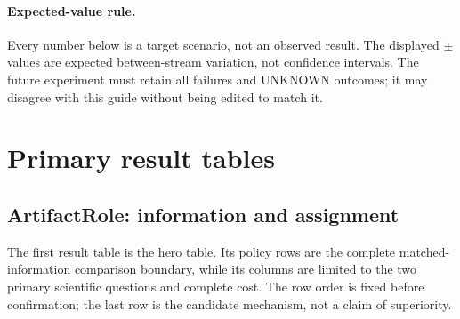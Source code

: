 \documentclass[sigconf,anonymous]{aamas}
\begin{document}
\paragraph{Expected-value rule.} Every number below is a target scenario, not an observed result. The displayed $\pm$ values are expected between-stream variation, not confidence intervals. The future experiment must retain all failures and UNKNOWN outcomes; it may disagree with this guide without being edited to match it.

\section{Primary result tables}

\subsection{ArtifactRole: information and assignment}

The first result table is the hero table. Its policy rows are the complete matched-information comparison boundary, while its columns are limited to the two primary scientific questions and complete cost. The row order is fixed before confirmation; the last row is the candidate mechanism, not a claim of superiority.
\end{document}
